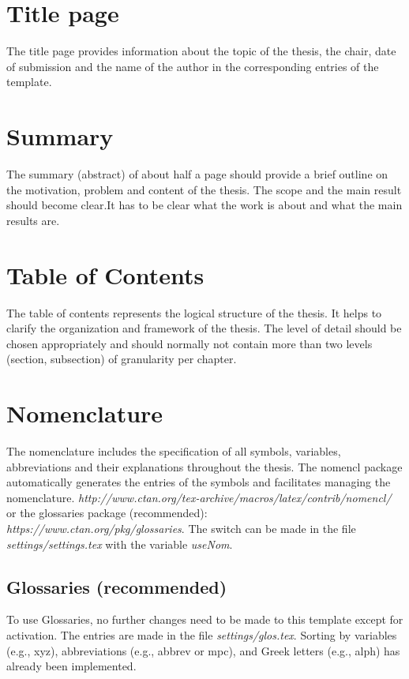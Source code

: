 \section{Title page}
\label{hinweise:titelblatt}

The title page provides information about the topic of the thesis, the chair, date of submission and the name of the author in the corresponding entries of the template.

\section{Summary}
\label{hinweise:kurzfassung}

The summary (abstract) of about half a page should provide a brief outline on the motivation, problem and content of the thesis. The scope and the main result should become clear.It has to be clear what the work is about and what the main results are.


\section{Table of Contents}
\label{hinweise:inhaltsverzeichnis}

The table of contents represents the logical structure of the thesis.
It helps to clarify the organization and framework of the thesis.
The level of detail should be chosen appropriately and should normally not contain more than two levels (section, subsection) of granularity per chapter.

\section{Nomenclature}
\label{hinweise:nomenklatur}

The nomenclature includes the specification of all symbols, variables, abbreviations and their explanations throughout the thesis.
The nomencl package automatically generates the entries of the symbols and facilitates
managing the nomenclature.
\sloppy \emph{http://www.ctan.org/tex-archive/macros/latex/contrib/nomencl/} or the glossaries package (recommended): \\ \emph{https://www.ctan.org/pkg/glossaries}. 
The switch can be made in the file \textit{settings/settings.tex} with the variable \textit{useNom}.



\subsection*{Glossaries (recommended)}
To use Glossaries, no further changes need to be made to this template except for activation.
The entries are made in the file \textit{settings/glos.tex}.
Sorting by variables (e.g., \gls{xyz}), abbreviations (e.g., \gls{abbrev} or \gls{mpc}), and Greek letters (e.g., \gls{alph}) has already been implemented.


